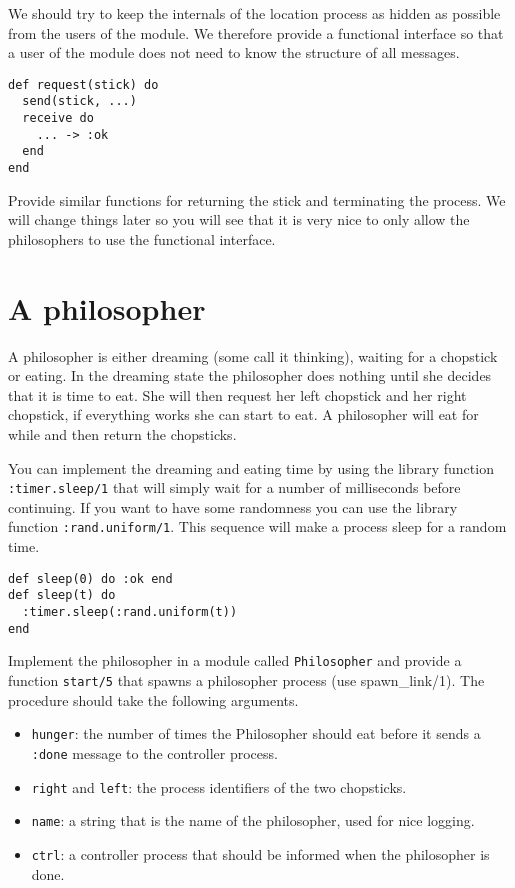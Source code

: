 \documentclass[a4paper,11pt]{article}
\begin{document}
We should try to keep the internals of the location process as hidden
as possible from the users of the module. We therefore provide a
functional interface so that a user of the module does not need to
know the structure of all messages.

\begin{verbatim}
def request(stick) do
  send(stick, ...)
  receive do
    ... -> :ok
  end
end
\end{verbatim}

Provide similar functions for returning the stick and terminating the
process. We will change things later so you will see that it is very
nice to only allow the philosophers to use the functional interface.



\section{A philosopher}

A philosopher is either dreaming (some call it thinking), waiting for
a chopstick or eating. In the dreaming state the philosopher does
nothing until she decides that it is time to eat. She will then
request her left chopstick and her right chopstick, if everything
works she can start to eat. A philosopher will eat for while and then
return the chopsticks.

You can implement the dreaming and eating time by using the library
function {\tt :timer.sleep/1} that will simply wait for a number of
milliseconds before continuing. If you want to have some randomness
you can use the library function {\tt :rand.uniform/1}. This sequence
will make a process sleep for a random time.

\begin{verbatim}
def sleep(0) do :ok end
def sleep(t) do 
  :timer.sleep(:rand.uniform(t))
end
\end{verbatim}

Implement the philosopher in a module called {\tt Philosopher} and
provide a function {\tt start/5} that spawns a philosopher
process (use spawn\_link/1). The procedure should take the following arguments.

\begin{itemize}

\item {\tt hunger}: the number of times the Philosopher should eat
  before it sends a {\tt :done} message to the controller process.

\item {\tt right} and {\tt left}: the process identifiers of the two
  chopsticks.

\item {\tt name}: a string that is the name of the philosopher, used
  for nice logging.

\item {\tt ctrl}: a controller process that should be informed when
  the philosopher is done.
\end{itemize}
\end{document}
